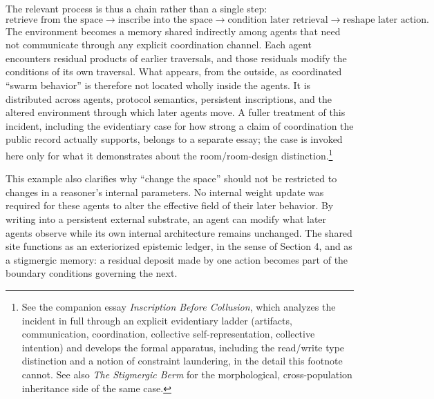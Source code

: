 \documentclass[11pt]{article}
\begin{document}
The relevant process is thus a chain rather than a single step:
\[
\text{retrieve from the space} \longrightarrow \text{inscribe into the space} \longrightarrow \text{condition later retrieval} \longrightarrow \text{reshape later action}.
\]
The environment becomes a memory shared indirectly among agents that need not communicate through any explicit coordination channel. Each agent encounters residual products of earlier traversals, and those residuals modify the conditions of its own traversal. What appears, from the outside, as coordinated ``swarm behavior'' is therefore not located wholly inside the agents. It is distributed across agents, protocol semantics, persistent inscriptions, and the altered environment through which later agents move. A fuller treatment of this incident, including the evidentiary case for how strong a claim of coordination the public record actually supports, belongs to a separate essay; the case is invoked here only for what it demonstrates about the room/room-design distinction.\footnote{See the companion essay \emph{Inscription Before Collusion}, which analyzes the incident in full through an explicit evidentiary ladder (artifacts, communication, coordination, collective self-representation, collective intention) and develops the formal apparatus, including the read/write type distinction and a notion of constraint laundering, in the detail this footnote cannot. See also \emph{The Stigmergic Berm} for the morphological, cross-population inheritance side of the same case.}

This example also clarifies why ``change the space'' should not be restricted to changes in a reasoner's internal parameters. No internal weight update was required for these agents to alter the effective field of their later behavior. By writing into a persistent external substrate, an agent can modify what later agents observe while its own internal architecture remains unchanged. The shared site functions as an exteriorized epistemic ledger, in the sense of Section 4, and as a stigmergic memory: a residual deposit made by one action becomes part of the boundary conditions governing the next.
\end{document}
